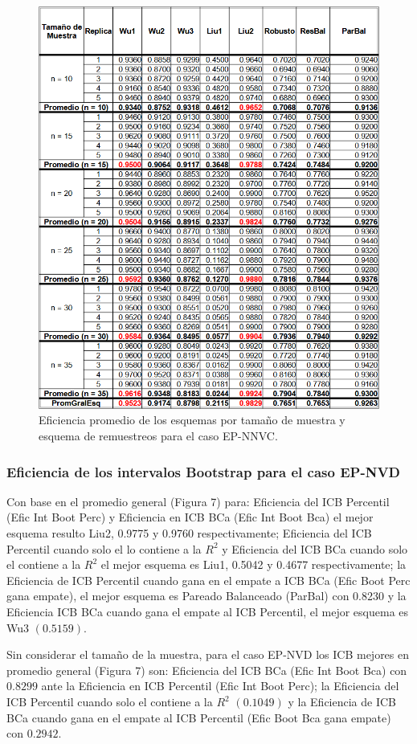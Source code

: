 \begin{figure}[ht] 
	\centering 
	\includegraphics[width=0.70\linewidth]{img/EP_NNVC_Efic_Esq.png} 
	\caption{Eficiencia promedio de los esquemas por tamaño de muestra y esquema de remuestreos para el caso EP-NNVC.} 
	\label{fig:EP_NNVC_Esq}
\end{figure}
\FloatBarrier



\subsubsection{Eficiencia de los intervalos Bootstrap para el caso EP-NVD}
Con base en el promedio general (Figura 7) para: Eficiencia del ICB Percentil (Efic Int Boot Perc) y Eficiencia en ICB BCa (Efic Int Boot Bca) el mejor esquema resulto Liu2, 0.9775 y 0.9760 respectivamente; Eficiencia del ICB Percentil cuando solo el lo contiene a la $R^{2}$ y Eficiencia del ICB BCa cuando solo el contiene a la $R^{2}$ el mejor esquema es Liu1, 0.5042 y 0.4677 respectivamente; 
la Eficiencia de ICB Percentil cuando gana en el empate a ICB BCa (Efic Boot Perc gana empate), el mejor esquema es Pareado Balanceado (ParBal) con 0.8230 y la Eficiencia ICB BCa cuando gana el empate al ICB Percentil, el mejor esquema es Wu3 $(0.5159)$.
\vspace{.5cm}


Sin considerar el tamaño de la muestra, para el caso EP-NVD los ICB mejores en promedio general (Figura 7) son: Eficiencia del ICB BCa (Efic Int Boot Bca) con $0.8299$ ante la Eficiencia en ICB Percentil (Efic Int Boot Perc); la Eficiencia del ICB Percentil cuando solo el contiene a la $R^{2}$ $(0.1049)$ y la Eficiencia de ICB BCa cuando gana en el empate al ICB Percentil (Efic Boot Bca gana empate) con $0.2942$.


